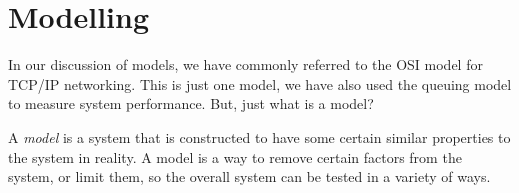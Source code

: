 \section{Modelling}\label{sec:Modelling}
In our discussion of models, we have commonly referred to the OSI model for TCP/IP networking.
This is just one model, we have also used the queuing model to measure system performance.
But, just what is a model?
\begin{definition}[Model]\label{def:Model}
  A \emph{model} is a system that is constructed to have some certain similar properties to the system in reality.
  A model is a way to remove certain factors from the system, or limit them, so the overall system can be tested in a variety of ways.
\end{definition}

